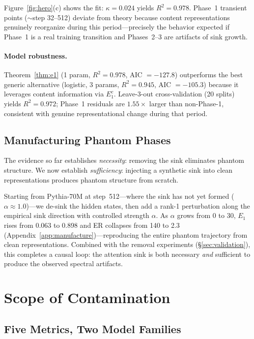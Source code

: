 \documentclass[11pt]{article}
\begin{document}
Figure~\ref{fig:hero}(c) shows the fit: $\kappa = 0.024$ yields $R^2 = 0.978$.
Phase~1 transient points (${\sim}$step 32--512) deviate from theory because content representations genuinely reorganize during this period---precisely the behavior expected if Phase~1 is a real training transition and Phases~2--3 are artifacts of sink growth.

\paragraph{Model robustness.}
Theorem~\ref{thm:e1} (1 param, $R^2 = 0.978$, AIC $= -127.8$) outperforms the best generic alternative (logistic, 3 params, $R^2 = 0.945$, AIC $= -105.3$) because it leverages content information via $E_1^c$.
Leave-3-out cross-validation (20 splits) yields $R^2 = 0.972$; Phase~1 residuals are $1.55\times$ larger than non-Phase-1, consistent with genuine representational change during that period.

\subsection{Manufacturing Phantom Phases}\label{sec:manufacture}

The evidence so far establishes \emph{necessity}: removing the sink eliminates phantom structure.
We now establish \emph{sufficiency}: injecting a synthetic sink into clean representations produces phantom structure from scratch.

Starting from Pythia-70M at step~512---where the sink has not yet formed ($\alpha \approx 1.0$)---we de-sink the hidden states, then add a rank-1 perturbation along the empirical sink direction with controlled strength $\alpha$.
As $\alpha$ grows from 0 to 30, $E_1$ rises from 0.063 to 0.898 and ER collapses from 140 to 2.3 (Appendix~\ref{app:manufacture})---reproducing the entire phantom trajectory from clean representations.
Combined with the removal experiments (\S\ref{sec:validation}), this completes a causal loop: the attention sink is both necessary \emph{and} sufficient to produce the observed spectral artifacts.

\section{Scope of Contamination}\label{sec:scope}

\subsection{Five Metrics, Two Model Families}\label{sec:fivemetrics}
\end{document}
